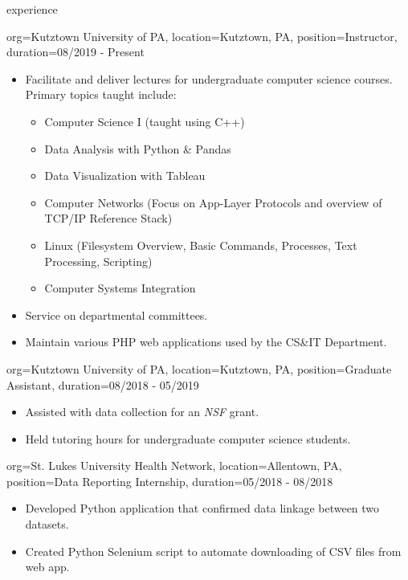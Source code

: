 \documentclass{resume}
\begin{document}
\makeheader

\begin{ResumeSection}{experience}
    \begin{ResumeSubsection}{org={Kutztown University of PA}, location={Kutztown, PA}, position={Instructor}, duration={08/2019 - Present}}
        \begin{itemize}
            \item Facilitate and deliver lectures for undergraduate computer science courses. Primary topics taught include: 
            \begin{itemize}
                \item Computer Science I (taught using C++)
                \item Data Analysis with Python \& Pandas
                \item Data Visualization with Tableau
                \item Computer Networks (Focus on App-Layer Protocols and overview of TCP/IP Reference Stack)
                \item Linux (Filesystem Overview, Basic Commands, Processes, Text Processing, Scripting)
                \item Computer Systems Integration
            \end{itemize}
            \item Service on departmental committees.
            \item Maintain various PHP web applications used by the CS\&IT Department.
        \end{itemize}
    \end{ResumeSubsection}    
    \begin{ResumeSubsection}{org={Kutztown University of PA}, location={Kutztown, PA}, position={Graduate Assistant}, duration={08/2018 - 05/2019}}
        \begin{itemize}
            \item Assisted with data collection for an \emph{NSF} grant.
            \item Held tutoring hours for undergraduate computer science students. 
        \end{itemize}
    \end{ResumeSubsection}
    \begin{ResumeSubsection}{org={St. Lukes University Health Network}, location={Allentown, PA}, position={Data Reporting Internship}, duration={05/2018 - 08/2018}}
        \begin{itemize}
            \item Developed Python application that confirmed data linkage between two datasets. 
            \item Created Python Selenium script to automate downloading of CSV files from web app.
        \end{itemize}
    \end{ResumeSubsection}
\end{ResumeSection}
\end{document}
